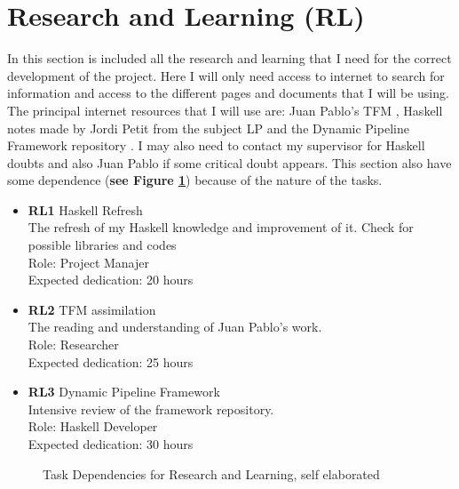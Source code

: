 \section{Research and Learning \textbf{(RL)}}
In this section is included all the research and learning that I need for the correct development of the project.
Here I will only need access to internet to search for information and access to the different pages and documents that I will be using.
The principal internet resources that I will use are: Juan Pablo's TFM \cite{TFM}, Haskell notes made by Jordi Petit from the subject LP \cite{ApuntesHaskell} and the Dynamic Pipeline Framework repository \cite{GitHubDynamicPipeline}.
I may also need to contact my supervisor for Haskell doubts and also Juan Pablo if some critical doubt appears.
This section also have some dependence (\textbf{see Figure \ref{RL_dependences}}) because of the nature of the tasks.
\begin{itemize}
    \item \textbf{RL1} Haskell Refresh \\
        The refresh of my Haskell knowledge and improvement of it. 
        Check for possible libraries and codes \\
        Role: Project Manajer \\
        Expected dedication: 20 hours
    \item \textbf{RL2} TFM assimilation\\
        The reading and understanding of Juan Pablo's work. \\
        Role: Researcher \\
        Expected dedication: 25 hours
    \item \textbf{RL3} Dynamic Pipeline Framework \\
        Intensive review of the framework repository. \\
        Role: Haskell Developer \\
        Expected dedication: 30 hours 
\end{itemize}
\begin{figure}[h]
    \centering
    \caption{Task Dependencies for Research and Learning, self elaborated}
    \label{RL_dependences}
\end{figure}

